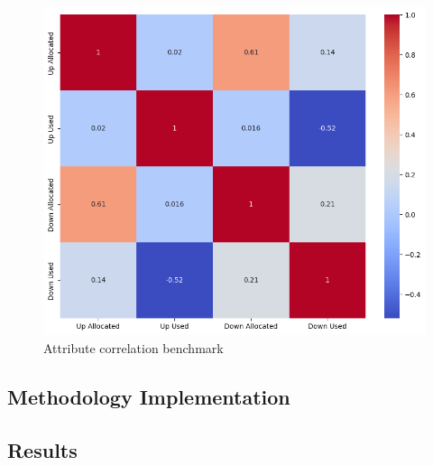 \begin{figure}[H]
    \centering
    \includegraphics[width=\textwidth]{plots/correlation_heatmap_benchmark.png}
    \caption{Attribute correlation benchmark}
    \label{fig:Attribute_correlation_benchmark}
  \end{figure}
  \unskip
  
  


\subsection{Methodology Implementation}
\subsection{Results}



